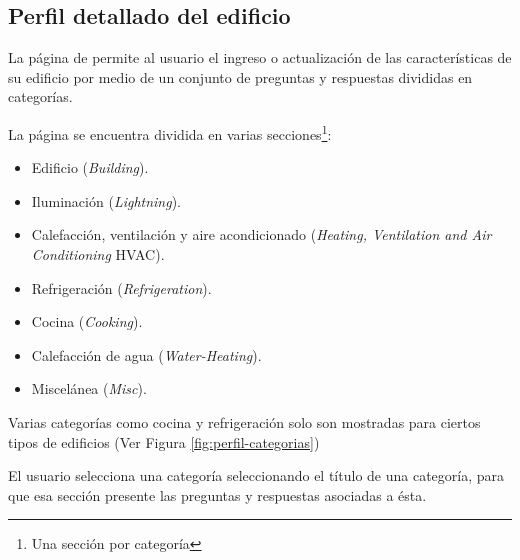 \subsection{Perfil detallado del edificio}

La página de  permite al usuario el ingreso
o actualización de las características de su edificio por medio de un
conjunto de preguntas y respuestas divididas en categorías.

La página se encuentra dividida en varias secciones\footnote{Una sección por
  categoría}:
\begin{itemize}
\item Edificio (\textit{Building}).
\item Iluminación (\textit{Lightning}).
\item Calefacción, ventilación y aire acondicionado (\textit{Heating, Ventilation and Air Conditioning} HVAC).
\item Refrigeración (\textit{Refrigeration}).
\item Cocina (\textit{Cooking}).
\item Calefacción de agua (\textit{Water-Heating}).
\item Miscelánea (\textit{Misc}).
\end{itemize}

Varias categorías como cocina y refrigeración solo son mostradas
para ciertos tipos de edificios (Ver Figura \ref{fig:perfil-categorias})


El usuario selecciona una categoría seleccionando el título de una categoría,
para que esa sección presente las preguntas y respuestas asociadas a ésta.

